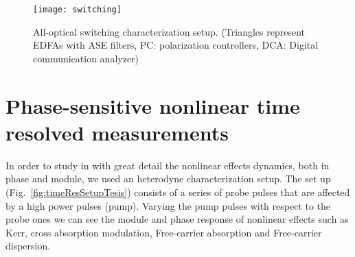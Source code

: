 \begin{figure}[htb]
    \centering
    \texttt{[image: switching]}
    \caption{All-optical switching characterization setup. (Triangles represent EDFAs with ASE filters, PC: polarization controllers, DCA: Digital communication analyzer)}
    \label{fig:switchingSetupSwitching}
\end{figure}

% 
% 
% 

\section{Phase-sensitive nonlinear time resolved measurements}
\label{ch:timeRes}
In order to study in with great detail the nonlinear effects dynamics, both in phase and module, we used an heterodyne characterization setup. The set up (Fig.~\ref{fig:timeResSetupTesis}) consists of a series of probe pulses that are affected by a high power pulses (pump). Varying the pump pulses with respect to the probe ones we can see the module and phase response of nonlinear effects such as Kerr, cross absorption modulation, Free-carrier absorption and Free-carrier dispersion.

